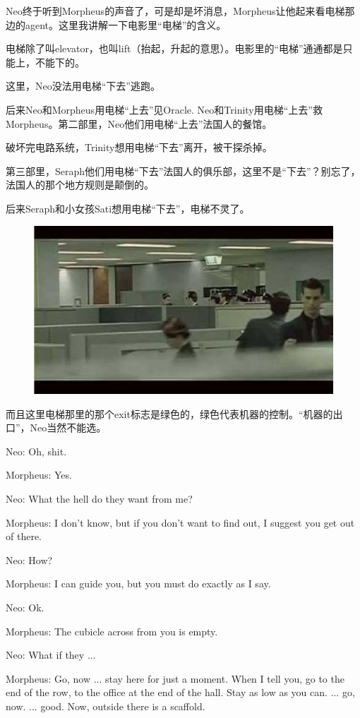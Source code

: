 \documentclass{ctexart}
\newenvironment{myquote}{\color{green} \setlength{\leftskip}{6em} \setlength{\rightskip}{4em} \setlength{\parindent}{-2em}}{\par}
\begin{document}
Neo终于听到Morpheus的声音了，可是却是坏消息，Morpheus让他起来看电梯那边的agent。这里我讲解一下电影里“电梯”的含义。

电梯除了叫elevator，也叫lift（抬起，升起的意思）。电影里的“电梯”通通都是只能上，不能下的。

这里，Neo没法用电梯“下去”逃跑。

后来Neo和Morpheus用电梯“上去”见Oracle. Neo和Trinity用电梯“上去”救Morpheus。第二部里，Neo他们用电梯“上去”法国人的餐馆。

破坏完电路系统，Trinity想用电梯“下去”离开，被干探杀掉。

第三部里，Seraph他们用电梯“下去”法国人的俱乐部，这里不是“下去”？别忘了，法国人的那个地方规则是颠倒的。

后来Seraph和小女孩Sati想用电梯“下去”，电梯不灵了。

\begin{figure}[htb]
\centering
\includegraphics[width=0.5\linewidth]{fig/read_Matrix-8}
\end{figure}

而且这里电梯那里的那个exit标志是绿色的，绿色代表机器的控制。“机器的出口”，Neo当然不能选。

\begin{myquote}
Neo: Oh, shit.

Morpheus: Yes.

Neo: What the hell do they want from me?

Morpheus: I don't know, but if you don't want to find out, I suggest you get out of there.

Neo: How?

Morpheus: I can guide you, but you must do exactly as I say.

Neo: Ok.

Morpheus: The cubicle across from you is empty.

Neo: What if they ...

Morpheus: Go, now ... stay here for just a moment. When I tell you, go to the end of the row, to the office at the end of the hall. Stay as low as you can. ... go, now. ... good. Now, outside there is a scaffold.
\end{myquote}
\end{document}
